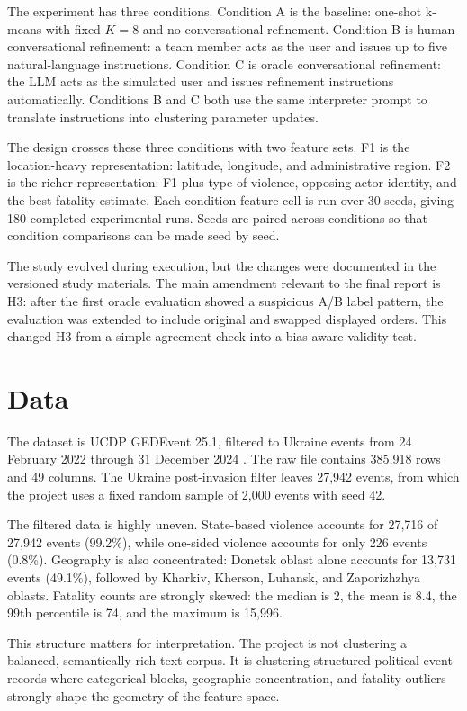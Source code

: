 \documentclass[11pt,a4paper]{article}
\begin{document}
The experiment has three conditions. Condition A is the baseline: one-shot k-means with fixed $K=8$ and no conversational refinement. Condition B is human conversational refinement: a team member acts as the user and issues up to five natural-language instructions. Condition C is oracle conversational refinement: the LLM acts as the simulated user and issues refinement instructions automatically. Conditions B and C both use the same interpreter prompt to translate instructions into clustering parameter updates.

The design crosses these three conditions with two feature sets. F1 is the location-heavy representation: latitude, longitude, and administrative region. F2 is the richer representation: F1 plus type of violence, opposing actor identity, and the best fatality estimate. Each condition-feature cell is run over 30 seeds, giving 180 completed experimental runs. Seeds are paired across conditions so that condition comparisons can be made seed by seed.

The study evolved during execution, but the changes were documented in the versioned study materials. The main amendment relevant to the final report is H3: after the first oracle evaluation showed a suspicious A/B label pattern, the evaluation was extended to include original and swapped displayed orders. This changed H3 from a simple agreement check into a bias-aware validity test.

\section{Data}

The dataset is UCDP GEDEvent 25.1, filtered to Ukraine events from 24 February 2022 through 31 December 2024 \cite{sundberg2013,croicu2017}. The raw file contains 385,918 rows and 49 columns. The Ukraine post-invasion filter leaves 27,942 events, from which the project uses a fixed random sample of 2,000 events with seed 42.

The filtered data is highly uneven. State-based violence accounts for 27,716 of 27,942 events (99.2\%), while one-sided violence accounts for only 226 events (0.8\%). Geography is also concentrated: Donetsk oblast alone accounts for 13,731 events (49.1\%), followed by Kharkiv, Kherson, Luhansk, and Zaporizhzhya oblasts. Fatality counts are strongly skewed: the median is 2, the mean is 8.4, the 99th percentile is 74, and the maximum is 15,996.

This structure matters for interpretation. The project is not clustering a balanced, semantically rich text corpus. It is clustering structured political-event records where categorical blocks, geographic concentration, and fatality outliers strongly shape the geometry of the feature space.
\end{document}

